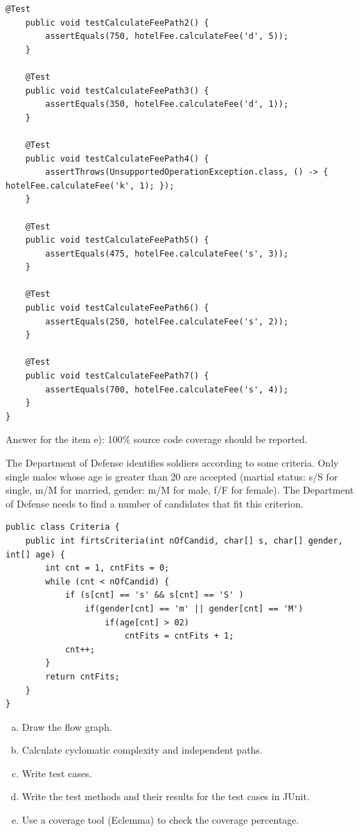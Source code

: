 \begin{solution}
\begin{lstlisting}[caption={All the tests thare defined by the independent paths of the HotelFee program.}]
	@Test
	public void testCalculateFeePath2() {
		assertEquals(750, hotelFee.calculateFee('d', 5));
	}
	
	@Test
	public void testCalculateFeePath3() {
		assertEquals(350, hotelFee.calculateFee('d', 1));
	}
	
	@Test
	public void testCalculateFeePath4() {
		assertThrows(UnsupportedOperationException.class, () -> { hotelFee.calculateFee('k', 1); });
	}
	
	@Test
	public void testCalculateFeePath5() {
		assertEquals(475, hotelFee.calculateFee('s', 3));
	}
	
	@Test
	public void testCalculateFeePath6() {
		assertEquals(250, hotelFee.calculateFee('s', 2));
	}
	
	@Test
	public void testCalculateFeePath7() {
		assertEquals(700, hotelFee.calculateFee('s', 4));
	}
}
    \end{lstlisting}
    
    Answer for the item e): 100\% source code coverage should be reported.
\end{solution}

\begin{exercise}
    The Department of Defense identifies soldiers according to some criteria. Only single males whose age is greater than 20 are accepted (martial status: s/S for single, m/M for married, gender: m/M for male, f/F for female). The Department of Defense needs to find a number of candidates that fit this criterion.
    
    \begin{lstlisting}[caption={Program for recruitment participation requirements of D.o.D..}]
public class Criteria {
    public int firtsCriteria(int nOfCandid, char[] s, char[] gender, int[] age) {
        int cnt = 1, cntFits = 0;
        while (cnt < nOfCandid) {
            if (s[cnt] == 's' && s[cnt] == 'S' )
                if(gender[cnt] == 'm' || gender[cnt] == 'M')
                    if(age[cnt] > 02)
                        cntFits = cntFits + 1;
            cnt++;
        }	
        return cntFits;
    }
}
    \end{lstlisting}
    
    \begin{enumerate}[a),noitemsep]
        \item Draw the flow graph.
        \item Calculate cyclomatic complexity and independent paths.
        \item Write test cases.
        \item Write the test methods and their results for the test cases in JUnit.
        \item Use a coverage tool (Eclemma) to check the coverage percentage.
    \end{enumerate}
\end{exercise}

